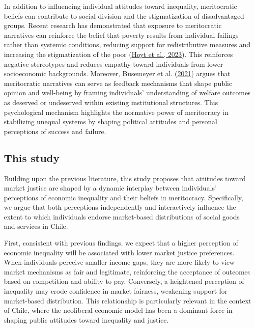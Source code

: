 \documentclass[
  12pt,
]{article}
\begin{document}
In addition to influencing individual attitudes toward inequality,
meritocratic beliefs can contribute to social division and the
stigmatization of disadvantaged groups. Recent research has demonstrated
that exposure to meritocratic narratives can reinforce the belief that
poverty results from individual failings rather than systemic
conditions, reducing support for redistributive measures and increasing
the stigmatization of the poor
(\protect\hyperlink{ref-hoyt_mindsets_2023}{Hoyt et al., 2023}). This
reinforces negative stereotypes and reduces empathy toward individuals
from lower socioeconomic backgrounds. Moreover, Busemeyer et al.
(\protect\hyperlink{ref-busemeyer_positive_2021}{2021}) argues that
meritocratic narratives can serve as feedback mechanisms that shape
public opinion and well-being by framing individuals' understanding of
welfare outcomes as deserved or undeserved within existing institutional
structures. This psychological mechanism highlights the normative power
of meritocracy in stabilizing unequal systems by shaping political
attitudes and personal perceptions of success and failure.

\hypertarget{this-study}{%
\subsection{This study}\label{this-study}}

Building upon the previous literature, this study proposes that
attitudes toward market justice are shaped by a dynamic interplay
between individuals' perceptions of economic inequality and their
beliefs in meritocracy. Specifically, we argue that both perceptions
independently and interactively influence the extent to which
individuals endorse market-based distributions of social goods and
services in Chile.

First, consistent with previous findings, we expect that a higher
perception of economic inequality will be associated with lower market
justice preferences. When individuals perceive smaller income gaps, they
are more likely to view market mechanisms as fair and legitimate,
reinforcing the acceptance of outcomes based on competition and ability
to pay. Conversely, a heightened perception of inequality may erode
confidence in market fairness, weakening support for market-based
distribution. This relationship is particularly relevant in the context
of Chile, where the neoliberal economic model has been a dominant force
in shaping public attitudes toward inequality and justice.
\end{document}
